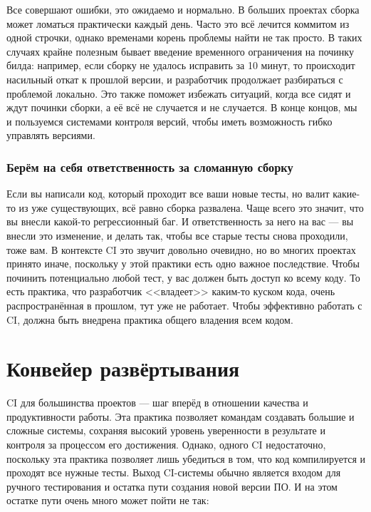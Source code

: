 \documentclass{../../text-style}
\begin{document}
Все совершают ошибки, это ожидаемо и нормально. В больших проектах сборка может ломаться практически каждый день. Часто это всё лечится коммитом из одной строчки, однако временами корень проблемы найти не так просто. В таких случаях крайне полезным бывает введение временного ограничения на починку билда: например, если сборку не удалось исправить за 10 минут, то происходит насильный откат к прошлой версии, и разработчик продолжает разбираться с проблемой локально. Это также поможет избежать ситуаций, когда все сидят и ждут починки сборки, а её всё не случается и не случается. В конце концов, мы и пользуемся системами контроля версий, чтобы иметь возможность гибко управлять версиями.

\subsubsection{Берём на себя ответственность за сломанную сборку}

Если вы написали код, который проходит все ваши новые тесты, но валит какие-то из уже существующих, всё равно сборка развалена. Чаще всего это значит, что вы внесли какой-то регрессионный баг. И ответственность за него на вас --- вы внесли это изменение, и делать так, чтобы все старые тесты снова проходили, тоже вам. В контексте CI это звучит довольно очевидно, но во многих проектах принято иначе, поскольку у этой практики есть одно важное последствие. Чтобы починить потенциально любой тест, у вас должен быть доступ ко всему коду. То есть практика, что разработчик <<владеет>> каким-то куском кода, очень распространённая в прошлом, тут уже не работает. Чтобы эффективно работать с CI, должна быть внедрена практика общего владения всем кодом.

\section{Конвейер развёртывания}

CI для большинства проектов --- шаг вперёд в отношении качества и продуктивности работы. Эта практика позволяет командам создавать большие и сложные системы, сохраняя высокий уровень уверенности в результате и контроля за процессом его достижения. Однако, одного CI недостаточно, поскольку эта практика позволяет лишь убедиться в том, что код компилируется и проходят все нужные тесты. Выход CI-системы обычно является входом для ручного тестирования и остатка пути создания новой версии ПО. И на этом остатке пути очень много может пойти не так:
\end{document}

